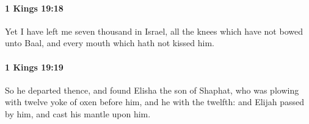 		\paragraph{1 Kings 19:18} %
			\label{1KINGS-19-18}

			Yet I have left me seven thousand in Israel, all the knees which have not bowed unto Baal, and every mouth which hath not kissed him.


		\paragraph{1 Kings 19:19} %
			\label{1KINGS-19-19}

			So he departed thence, and found Elisha the son of Shaphat, who was plowing with twelve yoke of oxen before him, and he with the twelfth: and Elijah passed by him, and cast his mantle upon him.


